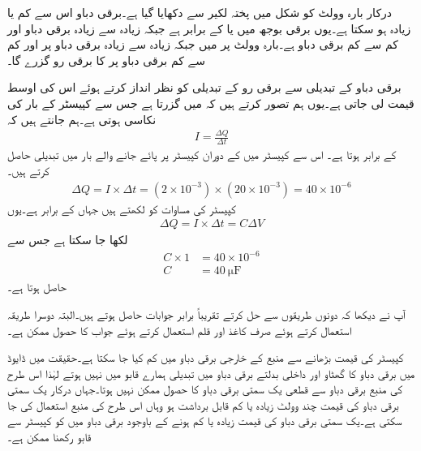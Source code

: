 درکار بارہ وولٹ کو شکل  میں پختہ لکیر سے دکھایا گیا ہے۔برقی دباو اس سے  کم یا زیادہ ہو سکتا ہے۔یوں برقی بوجھ میں   یا  کے برابر ہے جبکہ زیادہ سے زیادہ برقی دباو  اور کم سے کم برقی دباو  ہے۔بارہ وولٹ پر  میں  جبکہ زیادہ سے زیادہ برقی دباو پر   اور کم سے کم برقی دباو پر   کا برقی رو گزرے گا۔

برقی دباو کے تبدیلی سے برقی رو کے تبدیلی کو نظر انداز کرتے ہوئے اس کی اوسط قیمت لی جاتی ہے۔یوں ہم تصور کرتے ہیں کہ  میں  گزرتا ہے جس سے کپیسٹر کے بار کی نکاسی ہوتی ہے۔ہم جانتے ہیں کہ
\begin{align*}
I=\frac{\Delta Q}{\Delta t}
\end{align*}
کے برابر ہوتا ہے۔ اس سے کپیسٹر میں   کے دوران کپیسٹر پر پائے جانے والے بار میں تبدیلی  حاصل کرتے ہیں۔
\begin{align*}
\Delta Q=I \times \Delta t=\left(2 \times 10^{-3} \right) \times \left(20 \times 10^{-3} \right)=40 \times 10^{-6}
\end{align*}
کپیسٹر کی مساوات  کو  لکھتے ہیں جہاں  کے برابر ہے۔یوں
\begin{align*}
\Delta Q=I \times \Delta t=C \Delta V
\end{align*}
لکھا جا سکتا ہے جس سے
\begin{align*}
C \times 1&=40 \times 10^{-6}\\
C&=\SI{40}{\micro \farad}
\end{align*}
حاصل ہوتا ہے۔

آپ نے دیکھا کہ دونوں طریقوں سے حل کرتے تقریباً برابر جوابات حاصل ہوتے ہیں۔البتہ دوسرا طریقہ استعمال کرتے ہوئے صرف کاغذ اور قلم استعمال کرتے ہوئے جواب کا حصول ممکن ہے۔

کپیسٹر کی قیمت بڑھانے سے منبع کے خارجی برقی دباو میں  کم کیا جا سکتا ہے۔حقیقت میں ڈایوڈ میں برقی دباو کا گھٹاو اور داخلی بدلتے برقی دباو میں تبدیلی ہمارے قابو میں نہیں ہوتے لہٰذا اس طرح کی منبع برقی دباو سے قطعی یک سمتی برقی دباو کا حصول ممکن نہیں ہوتا۔جہاں درکار یک سمتی برقی دباو کی  قیمت چند وولٹ زیادہ یا کم  قابل برداشت ہو وہاں اس طرح کی منبع استعمال کی جا سکتی ہے۔یک سمتی برقی دباو کی قیمت زیادہ یا کم ہونے کے باوجود برقی دباو میں  کو کپیسٹر سے قابو رکھنا ممکن ہے۔


